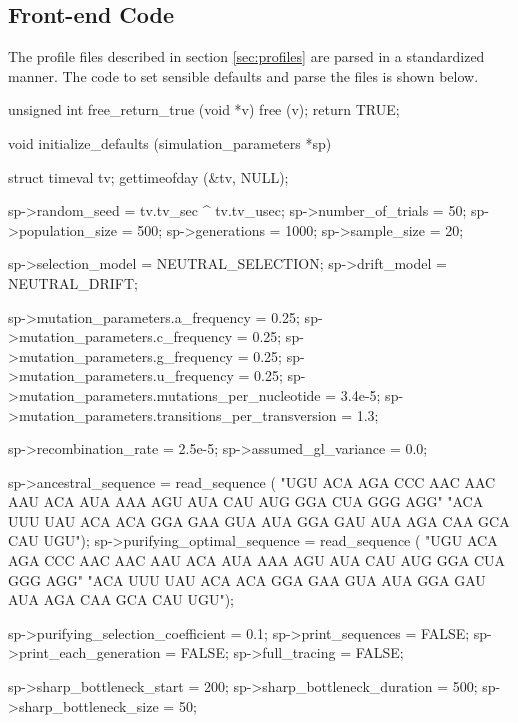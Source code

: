 \documentclass{article}
\begin{document}
    \subsection{Front-end Code}

      The profile files described in section \ref{sec:profiles} are parsed in a
      standardized manner. The code to set sensible defaults and parse the files
      is shown below.

\begin{ccode}
unsigned int free_return_true (void *v) {
  free (v);
  return TRUE;
}

void initialize_defaults (simulation_parameters *sp) {
  struct timeval tv;
  gettimeofday (&tv, NULL);

  sp->random_seed                          = tv.tv_sec ^ tv.tv_usec;
  sp->number_of_trials                     = 50;
  sp->population_size                      = 500;
  sp->generations                          = 1000;
  sp->sample_size                          = 20;

  sp->selection_model                      = NEUTRAL_SELECTION;
  sp->drift_model                          = NEUTRAL_DRIFT;

  sp->mutation_parameters.a_frequency      = 0.25;
  sp->mutation_parameters.c_frequency      = 0.25;
  sp->mutation_parameters.g_frequency      = 0.25;
  sp->mutation_parameters.u_frequency      = 0.25;
  sp->mutation_parameters.mutations_per_nucleotide = 3.4e-5;
  sp->mutation_parameters.transitions_per_transversion = 1.3;

  sp->recombination_rate                   = 2.5e-5;
  sp->assumed_gl_variance                  = 0.0;

  sp->ancestral_sequence = read_sequence (
    "UGU ACA AGA CCC AAC AAC AAU ACA AUA AAA AGU AUA CAU AUG GGA CUA GGG AGG"
    "ACA UUU UAU ACA ACA GGA GAA GUA AUA GGA GAU AUA AGA CAA GCA CAU UGU");
  sp->purifying_optimal_sequence = read_sequence (
    "UGU ACA AGA CCC AAC AAC AAU ACA AUA AAA AGU AUA CAU AUG GGA CUA GGG AGG"
    "ACA UUU UAU ACA ACA GGA GAA GUA AUA GGA GAU AUA AGA CAA GCA CAU UGU");

  sp->purifying_selection_coefficient      = 0.1;
  sp->print_sequences                      = FALSE;
  sp->print_each_generation                = FALSE;
  sp->full_tracing                         = FALSE;

  sp->sharp_bottleneck_start               = 200;
  sp->sharp_bottleneck_duration            = 500;
  sp->sharp_bottleneck_size                = 50;

}
\end{ccode}
\end{document}
